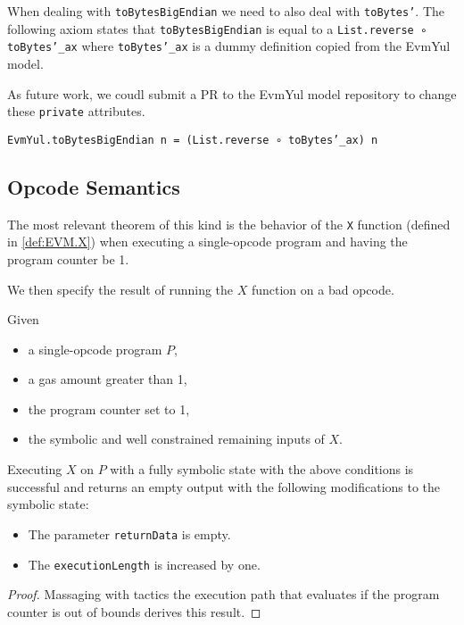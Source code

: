 When dealing with \texttt{toBytesBigEndian} we need to also deal with
\texttt{toBytes'}. The following axiom states that \texttt{toBytesBigEndian} is
equal to a \texttt{List.reverse ∘ toBytes'_ax} where \texttt{toBytes'_ax} is a
dummy definition copied from the EvmYul model.

As future work, we coudl submit a PR to the EvmYul model repository to change
these \texttt{private} attributes.

\begin{theorem}
\label{thm:toBytesBigEndian_rw}
\texttt{EvmYul.toBytesBigEndian n = (List.reverse ∘ toBytes'_ax) n}
\end{theorem}

\subsection{Opcode Semantics}

The most relevant theorem of this kind is the behavior of the \texttt{X}
function (defined in \ref{def:EVM.X}) when executing a single-opcode program and
having the program counter be 1.


We then specify the result of running the $X$ function on a bad opcode.

\begin{theorem}[X_bad_pc]\label{thm:X_bad_pc}\leanok
Given
\begin{itemize}
\item a single-opcode program $P$,
\item a gas amount greater than 1,
\item the program counter set to 1,
\item the symbolic and well constrained remaining inputs of $X$.
\end{itemize}
Executing $X$ on $P$ with a fully symbolic state with the above conditions
is successful and returns an empty output with the following modifications to
the symbolic state:
\begin{itemize}
\item The parameter \texttt{returnData} is empty.
\item The \texttt{executionLength} is increased by one.
\end{itemize}
\end{theorem}
\begin{proof}
\leanok
Massaging with tactics the execution path that evaluates if the program counter
is out of bounds derives this result.
\end{proof}

